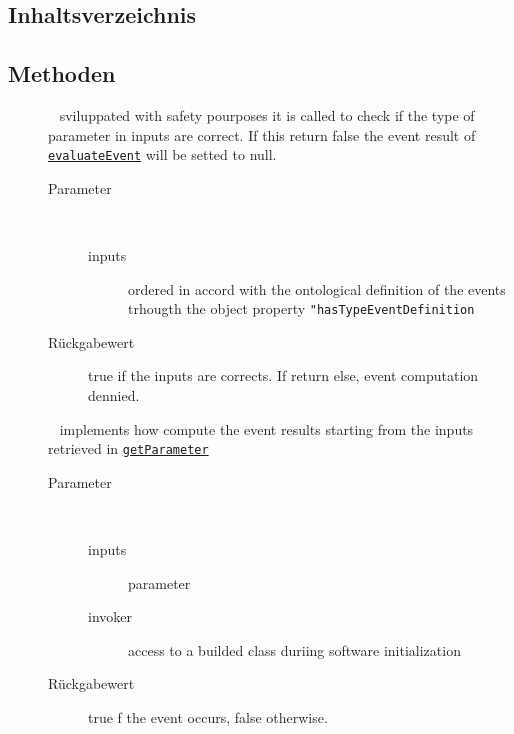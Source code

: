 \subsection{Inhaltsverzeichnis}
\subsection{Methoden}
\begin{description}
\item[{\label{ontologyFramework.OFEventManagement.OFLogicalEventManagement.OFEventInterface.isCorrectInput(java.util.List<ontologyFramework.OFEventManagement.EventComputedData>)}}]
~ sviluppated with safety pourposes it is called to check
 if the type of parameter in inputs are correct. If this return
 false the event result of \texttt{\hyperlink{ontologyFramework.OFEventManagement.OFLogicalEventManagement.OFEventInterface.evaluateEvent(java.util.List<ontologyFramework.OFEventManagement.EventComputedData>,ontologyFramework.OFRunning.OFInvokingManager.OFBuildedListInvoker)}{evaluateEvent}}
 will be setted to null.
\begin{description}
\item[Parameter] ~
\begin{description}
\item[inputs]
ordered in accord with the ontological definition of the events trhougth the
 object property \verb!"hasTypeEventDefinition!
\end{description}
\item[Rückgabewert] 
true if the inputs are corrects. If return else, event computation dennied.
\end{description}
\item[{\label{ontologyFramework.OFEventManagement.OFLogicalEventManagement.OFEventInterface.evaluateEvent(java.util.List<ontologyFramework.OFEventManagement.EventComputedData>,ontologyFramework.OFRunning.OFInvokingManager.OFBuildedListInvoker)}}]
~ implements how compute the event results starting from the inputs retrieved in
 \texttt{\hyperlink{ontologyFramework.OFEventManagement.OFEventParameterDefinition.getParameter()}{getParameter}}
\begin{description}
\item[Parameter] ~
\begin{description}
\item[inputs]
parameter
\item[invoker]
access to a builded class duriing software initialization
\end{description}
\item[Rückgabewert] 
true f the event occurs, false otherwise.
\end{description}
\end{description}

